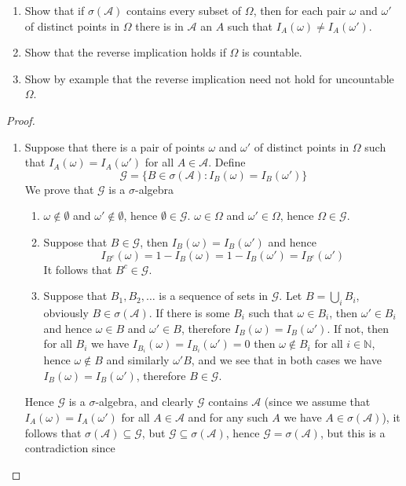 \documentclass[12pt]{article}
\newcommand{\N}{\mathbb{N}}
\newcommand{\A}{\mathcal{A}}
\newcommand{\G}{\mathcal{G}}
\newcommand{\seq}{\subseteq}
\newcommand{\om}{\omega}
\newcommand{\Om}{\Omega}
\newcommand{\es}{\emptyset}
\newenvironment{exercise}[2][Exercise]{\begin{trivlist}
\item[\hskip \labelsep {\bfseries #1}\hskip \labelsep {\bfseries #2.}]}{\end{trivlist}}
\begin{document}
\begin{exercise}{2.10}
    \begin{enumerate}
        \item Show that if $\sigma (\A)$ contains every subset of $\Omega$, then for each pair $\om$ and $\om'$ of distinct points in $\Om$ there is in $\A$ an $A$ such that $I_A (\om) \neq I_A (\om')$.
        \item Show that the reverse implication holds if $\Om$ is countable.
        \item Show by example that the reverse implication need not hold for uncountable $\Om$.
    \end{enumerate}
\end{exercise}
\begin{proof}
    \begin{enumerate}
        \item Suppose that there is a pair of points $\om$ and $\om'$ of distinct points in $\Om$ such that $I_{A} (\om) = I_{A} (\om')$ for all $A \in \A$. Define 
        \[ \G = \{ B \in \sigma (\A): I_{B} (\om) = I_{B} (\om') \} \]
        We prove that $\G$ is a $\sigma$-algebra
        \begin{enumerate}
            \item $\om \notin \es$ and $\om' \not\in \es$, hence $\es \in \G$. $\om \in \Om$ and $\om' \in \Om$, hence $\Om \in \G$.
            \item Suppose that $B \in \G$, then $I_B (\om) = I_B (\om')$ and hence 
            \[ I_{B^c} (\om) = 1 - I_{B} (\om) = 1 - I_B (\om') = I_{B^c} (\om') \]
            It follows that $B^{c} \in \G$.
            \item Suppose that $B_{1}, B_{2}, \ldots$ is a sequence of sets in $\G$. Let $B = \bigcup_{i} B_i$, obviously $B \in \sigma (\A)$. If there is some $B_{i}$ such that $\om \in B_i$, then $\om' \in B_i$ and hence $\om \in B$ and $\om' \in B$, therefore $I_B (\om) = I_B (\om')$. If not, then for all $B_{i}$ we have $I_{B_i} (\om) = I_{B_i} (\om') = 0$ then $\om \notin B_{i}$ for all $i \in \N$, hence $\om \notin B$ and similarly $\om' B$, and we see that in both cases we have $I_B (\om) = I_B (\om')$, therefore $B \in \G$.
        \end{enumerate}
        Hence $\G$ is a $\sigma$-algebra, and clearly $\G$ contains $\A$ (since we assume that $I_A (\om) = I_A (\om')$ for all $A \in \A$ and for any such $A$ we have $A \in \sigma(\A)$), it follows that $\sigma (\A) \seq \G$, but $\G \seq \sigma (\A)$, hence $\G = \sigma (\A)$, but this is a contradiction since 

\end{enumerate}
\end{proof}
\end{document}
